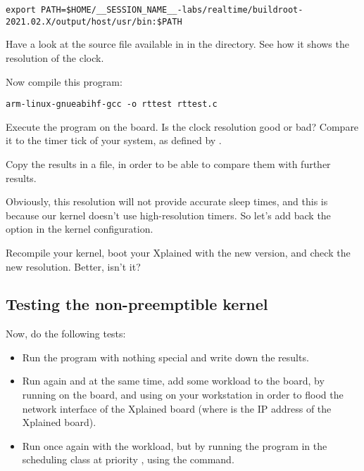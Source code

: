 \small
\begin{verbatim}
export PATH=$HOME/__SESSION_NAME__-labs/realtime/buildroot-2021.02.X/output/host/usr/bin:$PATH
\end{verbatim}
\normalsize

Have a look at the  source file available in
 in the  directory. See how it shows the
resolution of the  clock.

Now compile this program:
\begin{verbatim}
arm-linux-gnueabihf-gcc -o rttest rttest.c
\end{verbatim}

Execute the program on the board. Is the clock resolution good or bad?
Compare it to the timer tick of your system, as defined by
.

Copy the results in a file, in order to be able to compare them
with further results.

Obviously, this resolution will not provide accurate sleep times, and
this is because our kernel doesn't use high-resolution timers. So
let's add back the  option in the kernel
configuration.

Recompile your kernel, boot your Xplained with the new version, and
check the new resolution. Better, isn't it?

\subsection{Testing the non-preemptible kernel}

Now, do the following tests:
\begin{itemize}
\item Run the  program with nothing special and write
  down the results.
\item Run  again and at the same time, add some workload
  to the board, by running 
  on the board, and using  on your
  workstation in order to flood the network interface of the Xplained
  board (where  is the IP address of the Xplained
  board).
\item Run  once again with the workload, but by running
  the program in the  scheduling class at priority
  , using the  command.
\end{itemize}

